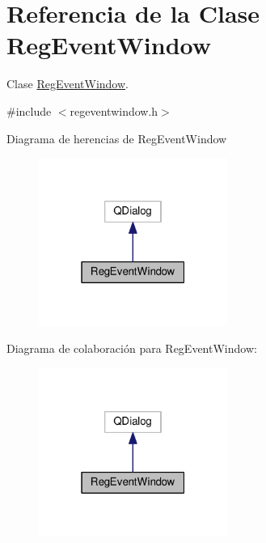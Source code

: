 \hypertarget{class_reg_event_window}{}\section{Referencia de la Clase Reg\+Event\+Window}
\label{class_reg_event_window}


Clase \hyperlink{class_reg_event_window}{Reg\+Event\+Window}.  




{\ttfamily \#include $<$regeventwindow.\+h$>$}



Diagrama de herencias de Reg\+Event\+Window\nopagebreak
\begin{figure}[H]
\begin{center}
\leavevmode
\includegraphics[width=175pt]{class_reg_event_window__inherit__graph}
\end{center}
\end{figure}


Diagrama de colaboración para Reg\+Event\+Window\+:\nopagebreak
\begin{figure}[H]
\begin{center}
\leavevmode
\includegraphics[width=175pt]{class_reg_event_window__coll__graph}
\end{center}
\end{figure}
